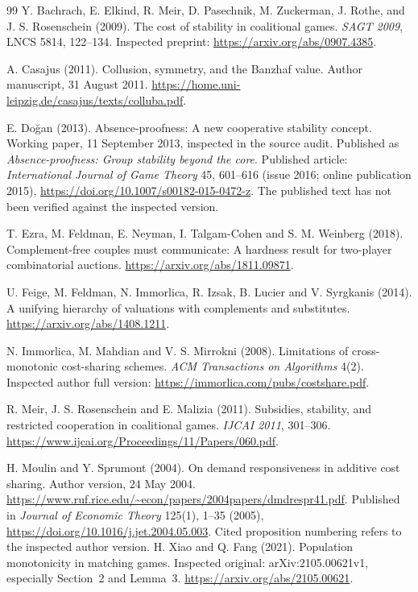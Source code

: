 \begin{thebibliography}{99}
Y. Bachrach, E. Elkind, R. Meir, D. Pasechnik, M. Zuckerman, J. Rothe,
and J. S. Rosenschein (2009).
The cost of stability in coalitional games.
\emph{SAGT 2009}, LNCS 5814, 122--134.
Inspected preprint: \url{https://arxiv.org/abs/0907.4385}.

A. Casajus (2011).
Collusion, symmetry, and the Banzhaf value.
Author manuscript, 31 August 2011.
\url{https://home.uni-leipzig.de/casajus/texts/colluba.pdf}.

E. Do\u{g}an (2013).
Absence-proofness: A new cooperative stability concept.
Working paper, 11 September 2013, inspected in the source audit.
Published as \emph{Absence-proofness: Group stability beyond the core}.
Published article: \emph{International Journal of Game Theory} 45, 601--616
(issue 2016; online publication 2015),
\url{https://doi.org/10.1007/s00182-015-0472-z}.
The published text has not been verified against the inspected version.

T. Ezra, M. Feldman, E. Neyman, I. Talgam-Cohen and S. M. Weinberg (2018).
Complement-free couples must communicate: A hardness result for two-player
combinatorial auctions. \url{https://arxiv.org/abs/1811.09871}.

U. Feige, M. Feldman, N. Immorlica, R. Izsak, B. Lucier and V. Syrgkanis (2014).
A unifying hierarchy of valuations with complements and substitutes.
\url{https://arxiv.org/abs/1408.1211}.

N. Immorlica, M. Mahdian and V. S. Mirrokni (2008).
Limitations of cross-monotonic cost-sharing schemes.
\emph{ACM Transactions on Algorithms} 4(2).
Inspected author full version: \url{https://immorlica.com/pubs/costshare.pdf}.

R. Meir, J. S. Rosenschein and E. Malizia (2011).
Subsidies, stability, and restricted cooperation in coalitional games.
\emph{IJCAI 2011}, 301--306.
\url{https://www.ijcai.org/Proceedings/11/Papers/060.pdf}.

H. Moulin and Y. Sprumont (2004).
On demand responsiveness in additive cost sharing.
Author version, 24 May 2004.
\url{https://www.ruf.rice.edu/~econ/papers/2004papers/dmdrespr41.pdf}.
Published in \emph{Journal of Economic Theory} 125(1), 1--35 (2005),
\url{https://doi.org/10.1016/j.jet.2004.05.003}.
Cited proposition numbering refers to the inspected author version.
H. Xiao and Q. Fang (2021).
Population monotonicity in matching games.
Inspected original: arXiv:2105.00621v1, especially Section~2 and Lemma~3.
\url{https://arxiv.org/abs/2105.00621}.

\end{thebibliography}
